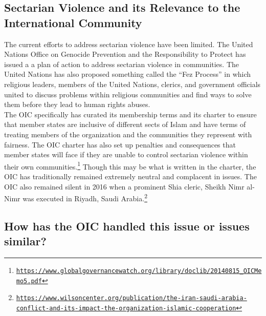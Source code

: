 \documentclass[10pt, letterpaper]{article}
\begin{document}
\subsection{Sectarian Violence and its Relevance to the International
Community}

The current efforts to address sectarian violence have been limited. The
United Nations Office on Genocide Prevention and the Responsibility to
Protect has issued a a plan of action to address sectarian violence in
communities. The United Nations has also proposed something called the
``Fez Process'' in which religious leaders, members of the United
Nations, clerics, and government officials united to discuss problems
within religious communities and find ways to solve them before they
lead to human rights abuses. \\

The OIC specifically has curated its membership terms and its charter to
ensure that member states are inclusive of different sects of Islam and
have terms of treating members of the organization and the communities
they represent with fairness. The OIC charter has also set up penalties
and consequences that member states will face if they are unable to
control sectarian violence within their own communities.\footnote{\texttt{\href{https://www.globalgovernancewatch.org/library/doclib/20140815_OICMemo5.pdf}{{https://www.globalgovernancewatch.org/library/doclib/20140815\_OICMemo5.pdf}}}}
Though this may be what is written in the charter, the OIC has
traditionally remained extremely neutral and complacent in issues. The
OIC also remained silent in 2016 when a prominent Shia cleric, Sheikh
Nimr al-Nimr was executed in Riyadh, Saudi Arabia.\footnote{\texttt{\href{https://www.wilsoncenter.org/publication/the-iran-saudi-arabia-conflict-and-its-impact-the-organization-islamic-cooperation}{{https://www.wilsoncenter.org/publication/the-iran-saudi-arabia-conflict-and-its-impact-the-organization-islamic-cooperation}}}}

\subsection{How has the OIC handled this issue or issues similar?}
\end{document}
